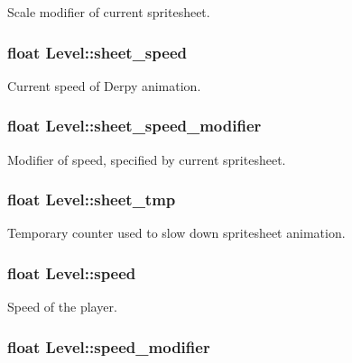 \-Scale modifier of current spritesheet. \hypertarget{structLevel_a41db1345ac158898450907010a49748f}{
\subsubsection[{sheet\-\_\-speed}]{\setlength{\rightskip}{0pt plus 5cm}float {\bf \-Level\-::sheet\-\_\-speed}}}\label{structLevel_a41db1345ac158898450907010a49748f}
\-Current speed of \-Derpy animation. \hypertarget{structLevel_a3cae10fd441bcc14b6a47dd5fedafa59}{
\subsubsection[{sheet\-\_\-speed\-\_\-modifier}]{\setlength{\rightskip}{0pt plus 5cm}float {\bf \-Level\-::sheet\-\_\-speed\-\_\-modifier}}}\label{structLevel_a3cae10fd441bcc14b6a47dd5fedafa59}
\-Modifier of speed, specified by current spritesheet. \hypertarget{structLevel_a22e80ea91fd267dae85c0457e581d072}{
\subsubsection[{sheet\-\_\-tmp}]{\setlength{\rightskip}{0pt plus 5cm}float {\bf \-Level\-::sheet\-\_\-tmp}}}\label{structLevel_a22e80ea91fd267dae85c0457e581d072}
\-Temporary counter used to slow down spritesheet animation. \hypertarget{structLevel_a936a1d131d1e056878474ca831c5e88f}{
\subsubsection[{speed}]{\setlength{\rightskip}{0pt plus 5cm}float {\bf \-Level\-::speed}}}\label{structLevel_a936a1d131d1e056878474ca831c5e88f}
\-Speed of the player. \hypertarget{structLevel_a0f6fa70a2e0b85437dc1973d1409381f}{
\subsubsection[{speed\-\_\-modifier}]{\setlength{\rightskip}{0pt plus 5cm}float {\bf \-Level\-::speed\-\_\-modifier}}}\label{structLevel_a0f6fa70a2e0b85437dc1973d1409381f}
